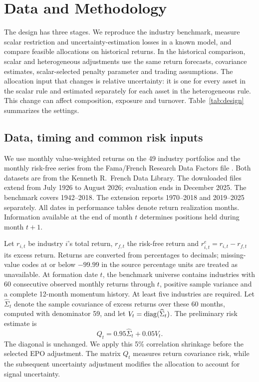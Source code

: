 \section{Data and Methodology}
\label{sec:method}
The design has three stages. We reproduce the industry benchmark, measure scalar restriction and uncertainty-estimation losses in a known model, and compare feasible allocations on historical returns. In the historical comparison, scalar and heterogeneous adjustments use the same return forecasts, covariance estimates, scalar-selected penalty parameter and trading assumptions. The allocation input that changes is relative uncertainty: it is one for every asset in the scalar rule and estimated separately for each asset in the heterogeneous rule. This change can affect composition, exposure and turnover. Table~\ref{tab:design} summarizes the settings.

\subsection{Data, timing and common risk inputs}
We use monthly value-weighted returns on the 49 industry portfolios \citep{frenchdata} and the monthly risk-free series from the Fama/French Research Data Factors file \citep{frenchfactors}. Both datasets are from the Kenneth R.\ French Data Library. The downloaded files extend from July 1926 to August 2026; evaluation ends in December 2025. The benchmark covers 1942--2018. The extension reports 1970--2018 and 2019--2025 separately. All dates in performance tables denote return realization months. Information available at the end of month $t$ determines positions held during month $t+1$.

Let $r_{i,t}$ be industry $i$'s total return, $r_{f,t}$ the risk-free return and $r^e_{i,t}=r_{i,t}-r_{f,t}$ its excess return. Returns are converted from percentages to decimals; missing-value codes at or below $-99.99$ in the source percentage units are treated as unavailable. At formation date $t$, the benchmark universe contains industries with 60 consecutive observed monthly returns through $t$, positive sample variance and a complete 12-month momentum history. At least five industries are required. Let $\widehat\Sigma_t$ denote the sample covariance of excess returns over these 60 months, computed with denominator 59, and let $V_t=\operatorname{diag}(\widehat\Sigma_t)$. The preliminary risk estimate is
\begin{equation}
Q_t=0.95\widehat\Sigma_t+0.05V_t.
\label{eq:risk}
\end{equation}
The diagonal is unchanged. We apply this 5\% correlation shrinkage before the selected EPO adjustment. The matrix $Q_t$ measures return covariance risk, while the subsequent uncertainty adjustment modifies the allocation to account for signal uncertainty.

